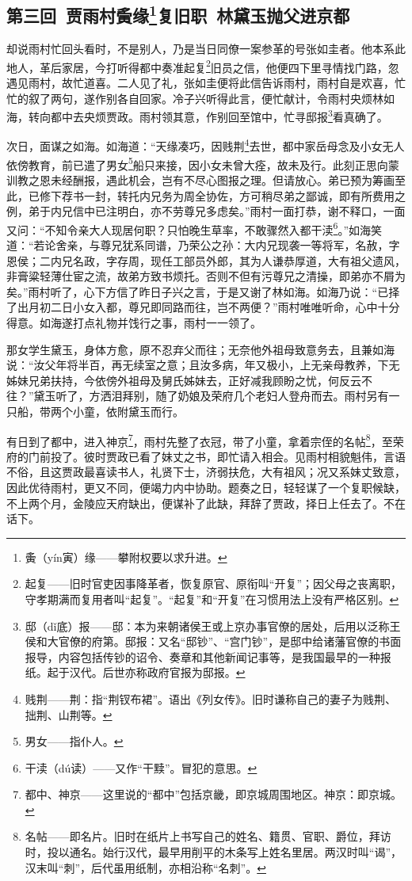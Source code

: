 \clearpage
\subsection*{第三回\ 贾雨村夤缘\footnote{夤（yín寅）缘——攀附权要以求升进。}复旧职\ 林黛玉抛父进京都}
\par 却说雨村忙回头看时，不是别人，乃是当日同僚一案参革的号张如圭者。他本系此地人，革后家居，今打听得都中奏准起复\footnote{起复——旧时官吏因事降革者，恢复原官、原衔叫“开复”；因父母之丧离职，守孝期满而复用者叫“起复”。“起复”和“开复”在习惯用法上没有严格区别。}旧员之信，他便四下里寻情找门路，忽遇见雨村，故忙道喜。二人见了礼，张如圭便将此信告诉雨村，雨村自是欢喜，忙忙的叙了两句，遂作别各自回家。冷子兴听得此言，便忙献计，令雨村央烦林如海，转向都中去央烦贾政。雨村领其意，作别回至馆中，忙寻邸报\footnote{邸（dǐ底）报——邸：本为来朝诸侯王或上京办事官僚的居处，后用以泛称王侯和大官僚的府第。邸报：又名“邸钞”、“宫门钞”，是邸中给诸藩官僚的书面报导，内容包括传钞的诏令、奏章和其他新闻记事等，是我国最早的一种报纸。起于汉代。后世亦称政府官报为邸报。}看真确了。
\par 次日，面谋之如海。如海道：“天缘凑巧，因贱荆\footnote{贱荆——荆：指“荆钗布裙”。语出《列女传》。旧时谦称自己的妻子为贱荆、拙荆、山荆等。}去世，都中家岳母念及小女无人依傍教育，前已遣了男女\footnote{男女——指仆人。}船只来接，因小女未曾大痊，故未及行。此刻正思向蒙训教之恩未经酬报，遇此机会，岂有不尽心图报之理。但请放心。弟已预为筹画至此，已修下荐书一封，转托内兄务为周全协佐，方可稍尽弟之鄙诚，即有所费用之例，弟于内兄信中已注明白，亦不劳尊兄多虑矣。”雨村一面打恭，谢不释口，一面又问：“不知令亲大人现居何职？只怕晚生草率，不敢骤然入都干渎\footnote{干渎（dú读）——又作“干黩”。冒犯的意思。}。”如海笑道：“若论舍亲，与尊兄犹系同谱，乃荣公之孙：大内兄现袭一等将军，名赦，字恩侯；二内兄名政，字存周，现任工部员外郎，其为人谦恭厚道，大有祖父遗风，非膏粱轻薄仕宦之流，故弟方致书烦托。否则不但有污尊兄之清操，即弟亦不屑为矣。”雨村听了，心下方信了昨日子兴之言，于是又谢了林如海。如海乃说：“已择了出月初二日小女入都，尊兄即同路而往，岂不两便？”雨村唯唯听命，心中十分得意。如海遂打点礼物并饯行之事，雨村一一领了。
\par 那女学生黛玉，身体方愈，原不忍弃父而往；无奈他外祖母致意务去，且兼如海说：“汝父年将半百，再无续室之意；且汝多病，年又极小，上无亲母教养，下无姊妹兄弟扶持，今依傍外祖母及舅氏姊妹去，正好减我顾盼之忧，何反云不往？”黛玉听了，方洒泪拜别，随了奶娘及荣府几个老妇人登舟而去。雨村另有一只船，带两个小童，依附黛玉而行。
\par 有日到了都中，进入神京\footnote{都中、神京——这里说的“都中”包括京畿，即京城周围地区。神京：即京城。}，雨村先整了衣冠，带了小童，拿着宗侄的名帖\footnote{名帖——即名片。旧时在纸片上书写自己的姓名、籍贯、官职、爵位，拜访时，投以通名。始行汉代，最早用削平的木条写上姓名里居。两汉时叫“谒”，汉末叫“刺”，后代虽用纸制，亦相沿称“名刺”。}，至荣府的门前投了。彼时贾政已看了妹丈之书，即忙请入相会。见雨村相貌魁伟，言语不俗，且这贾政最喜读书人，礼贤下士，济弱扶危，大有祖风；况又系妹丈致意，因此优待雨村，更又不同，便竭力内中协助。题奏之日，轻轻谋了一个复职候缺，不上两个月，金陵应天府缺出，便谋补了此缺，拜辞了贾政，择日上任去了。不在话下。
